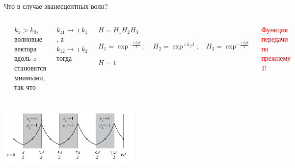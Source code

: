 \documentclass[9pt, compress, xcolor=table]{beamer}
\begin{document}
\begin{frame}{Что в случае эванесцентных волн?}

\begin{columns}[c]

\column{6cm}

\begin{center}
\includegraphics[width=4cm]{neg_ref_40}
\end{center}

\column{6cm} {\scriptsize $k_x>k_0$, волновые вектора вдоль $z$ становятся мнимыми, так что

$k_{z1}\rightarrow \imath k_1$, а $k_{z2}\rightarrow \imath k_2$ тогда

\begin{center}
$H=H_1H_2H_3$

$H_1= \exp^{-\frac{\imath k_z d}{2}};\quad H_2= \exp^{\imath k_z d};\quad H_3= \exp^{-\frac{\imath
k_z d}{2}}$

$H=1$
\end{center}
\textcolor{red}{Функция передачи по прежнему 1!} }
\end{columns}

\begin{center}
\includegraphics[width=7cm]{neg_ref_40b}
\end{center}

\end{frame}
\end{document}
